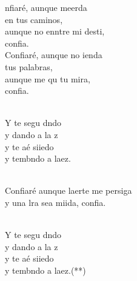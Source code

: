 \documentclass[12pt]{article}
\begin{document}
\begin{multicols*}{2}
\begin{cancion}[Confiaré][]%
	nfiaré, aunque meerda \\
en tus caminos,\\
	aunque no enntre mi desti, \\
	confia. \\
	Confiaré, aunque no ienda \\
tus palabras,\\
	aunque me qu tu mira, \\
	confia. \\\jump\\
	\begin{chorus}%
	Y te segu dndo  \\
	y dando a la z\\
	y te aé siiedo \\
	y tembndo a laez.\\
	\end{chorus}%
	\jump\\
	Confiaré aunque laerte me persiga\\
	y una lra sea miida, confia. \\\jump\\
	\begin{chorus}%
	Y te segu dndo  \\
	y dando a la z\\
	y te aé siiedo \\
	y tembndo a laez.(**)\\
	\end{chorus}%
	\jump\\
\end{cancion}%


\end{multicols*}
\end{document}
